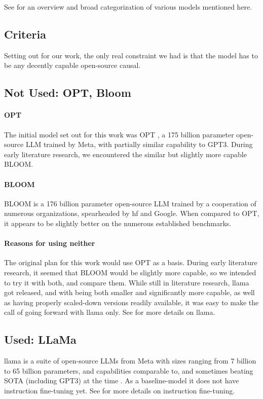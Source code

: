 See  for an overview and broad categorization of various models mentioned here.

\subsection{Criteria}\label{sub:criteria}
Setting out for our work, the only real constraint we had is that the model has to be any decently capable open-source \gls{causal}.

\subsection{Not Used: OPT, Bloom}\label{sub:opt}
\paragraph{OPT}\label{par:opt}
The initial model set out for this work was \gls{OPT} \cite{zhang_opt_2022}, a 175 billion parameter open-source \gls{LLM} trained by \gls{Meta}, with partially similar capability to \gls{GPT3}. During early literature research, we encountered the similar but slightly more capable \gls{BLOOM}.

\paragraph{BLOOM}\label{par:bloom}
\gls{BLOOM} \cite{workshop_bloom_2022} is a 176 billion parameter open-source \gls{LLM} trained by a cooperation of numerous organizations, spearheaded by \gls{hf} and \gls{Google}. When compared to \gls{OPT}, it appears to be slightly better on the numerous established benchmarks.

\paragraph{Reasons for using neither}
The original plan for this work would use \gls{OPT} as a basis. During early literature research, it seemed that \gls{BLOOM} would be slightly more capable, so we intended to try it with both, and compare them. 
While still in literature research, \gls{llama} got released, and with being both smaller and significantly more capable, as well as having properly scaled-down versions readily available, it was easy to make the call of going forward with \gls{llama} only. 
See  for more details on \gls{llama}.

\subsection{Used: LLaMa}\label{sub:llama}
\gls{llama} is a suite of open-source \glspl{LLM} from \gls{Meta} with sizes ranging from 7 billion to 65 billion parameters, and capabilities comparable to, and sometimes beating \gls{SOTA} (including \gls{GPT3}) at the time \cite{touvron_llama_2023}.
As a baseline-model it does not have instruction fine-tuning yet. See  for more details on instruction fine-tuning.

